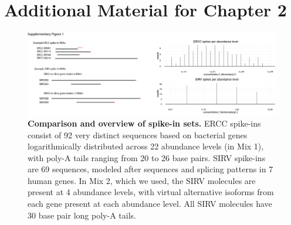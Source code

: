 \chapter{Additional Material for Chapter 2} 

\graphicspath{{Appendix1/Figs/}}

\begin{figure}
    \centering
    \includegraphics[width=\textwidth]{"Supp Figure 1"}
    \caption[Comparison and overview of spike-in sets]{\textbf{Comparison and overview of spike-in sets.} ERCC spike-ins consist of 92 very distinct sequences based on bacterial genes logarithmically distributed across 22 abundance levels (in Mix 1), with poly-A tails ranging from 20 to 26 base pairs. SIRV spike-ins are 69 sequences, modeled after sequences and splicing patterns in 7 human genes. In Mix 2, which we used, the SIRV molecules are present at 4 abundance levels, with virtual alternative isoforms from each gene present at each abundance level. All SIRV molecules have 30 base pair long poly-A tails.}
    \label{fig:spikeins}
\end{figure}

